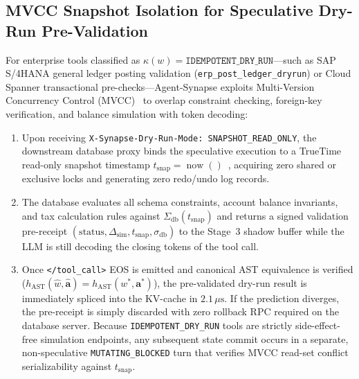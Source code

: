\documentclass[10pt,conference]{IEEEtran}
\begin{document}
\subsection{MVCC Snapshot Isolation for Speculative Dry-Run Pre-Validation}
For enterprise tools classified as $\kappa(w) = \texttt{IDEMPOTENT\_DRY\_RUN}$---such as SAP S/4HANA general ledger posting validation (\texttt{erp\_post\_ledger\_dryrun}) or Cloud Spanner transactional pre-checks---Agent-Synapse exploits Multi-Version Concurrency Control (MVCC)~\cite{corbett2012spanner} to overlap constraint checking, foreign-key verification, and balance simulation with token decoding:
\begin{enumerate}
    \item Upon receiving \texttt{X-Synapse-Dry-Run-Mode: SNAPSHOT\_READ\_ONLY}, the downstream database proxy binds the speculative execution to a TrueTime read-only snapshot timestamp $t_{\text{snap}} = \operatorname{now}()$~\cite{corbett2012spanner}, acquiring zero shared or exclusive locks and generating zero redo/undo log records.
    \item The database evaluates all schema constraints, account balance invariants, and tax calculation rules against $\Sigma_{\text{db}}(t_{\text{snap}})$ and returns a signed validation pre-receipt $(\text{status}, \Delta_{\text{sim}}, t_{\text{snap}}, \sigma_{\text{db}})$ to the Stage~3 shadow buffer while the LLM is still decoding the closing tokens of the tool call.
    \item Once \texttt{</tool\_call>} EOS is emitted and canonical AST equivalence is verified ($h_{\text{AST}}(\hat{w}, \hat{\mathbf{a}}) = h_{\text{AST}}(w^*, \mathbf{a}^*)$), the pre-validated dry-run result is immediately spliced into the KV-cache in $2.1\,\mu\text{s}$. If the prediction diverges, the pre-receipt is simply discarded with zero rollback RPC required on the database server. Because \texttt{IDEMPOTENT\_DRY\_RUN} tools are strictly side-effect-free simulation endpoints, any subsequent state commit occurs in a separate, non-speculative \texttt{MUTATING\_BLOCKED} turn that verifies MVCC read-set conflict serializability against $t_{\text{snap}}$.
\end{enumerate}
\end{document}
